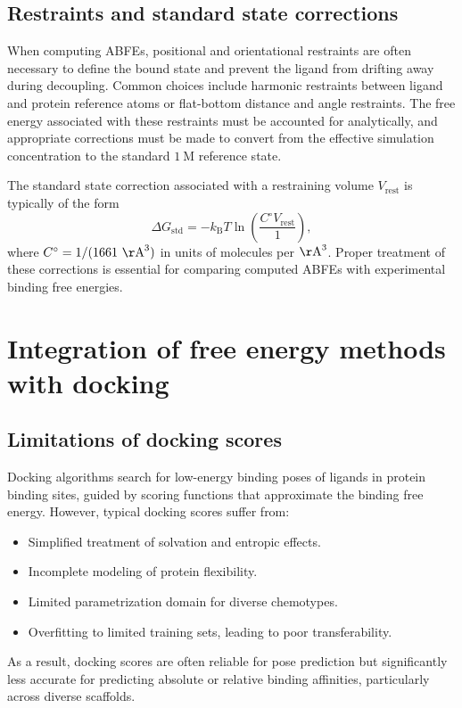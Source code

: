 \documentclass[12pt]{article}
\begin{document}
\subsection{Restraints and standard state corrections}

When computing ABFEs, positional and orientational restraints are often necessary to define the bound state and prevent the ligand from drifting away during decoupling. 
Common choices include harmonic restraints between ligand and protein reference atoms or flat-bottom distance and angle restraints.\cite{CH10_gilson1997calculation,CH10_deng2009abfe} 
The free energy associated with these restraints must be accounted for analytically, and appropriate corrections must be made to convert from the effective simulation concentration to the standard \(1\ \mathrm{M}\) reference state. 

The standard state correction associated with a restraining volume \(V_\mathrm{rest}\) is typically of the form
\[
\Delta G_\mathrm{std} = -k_\mathrm{B}T \ln \left( \frac{C^\circ V_\mathrm{rest}}{1} \right),
\]
where \(C^\circ = 1/(1661\ \mathrm{\AA}^3)\) in units of molecules per \(\mathrm{\AA}^3\). 
Proper treatment of these corrections is essential for comparing computed ABFEs with experimental binding free energies. 

\section{Integration of free energy methods with docking}

\subsection{Limitations of docking scores}

Docking algorithms search for low-energy binding poses of ligands in protein binding sites, guided by scoring functions that approximate the binding free energy.\cite{CH10_brooijmans2003docking,CH10_michel2006binding} 
However, typical docking scores suffer from:
\begin{itemize}
  \item Simplified treatment of solvation and entropic effects.
  \item Incomplete modeling of protein flexibility.
  \item Limited parametrization domain for diverse chemotypes.
  \item Overfitting to limited training sets, leading to poor transferability. 
\end{itemize}
As a result, docking scores are often reliable for pose prediction but significantly less accurate for predicting absolute or relative binding affinities, particularly across diverse scaffolds. 
\end{document}
